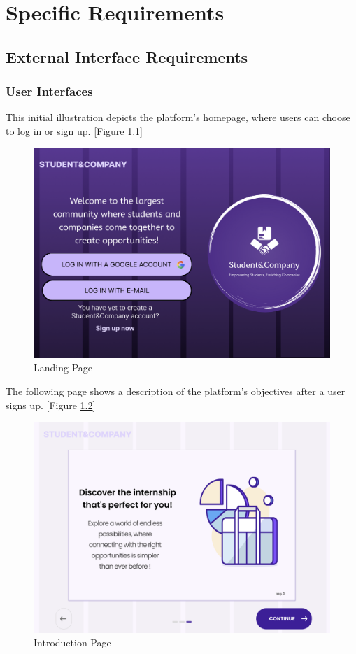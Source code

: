 \chapter{Specific Requirements}

\section{External Interface Requirements}

\subsection{User Interfaces}


This initial illustration depicts the platform's homepage, where users can choose to log in or sign up. [Figure \ref{fig:Landing Page}]

\begin{figure}[H]
    \centering
    \includegraphics[width=0.5\linewidth]{Interface Images//log in sing up/image.png}
    \caption{Landing Page}
    \label{fig:Landing Page}
\end{figure}

The following page shows a description of the platform's objectives after a user signs up. [Figure \ref{fig:Introduction Page}]

\begin{figure} [H]
    \centering
    \includegraphics[width=0.5\linewidth]{Interface Images/log in sing up/Screenshot 2024-12-04 115134.png}
    \caption{Introduction Page}
    \label{fig:Introduction Page}
\end{figure}

